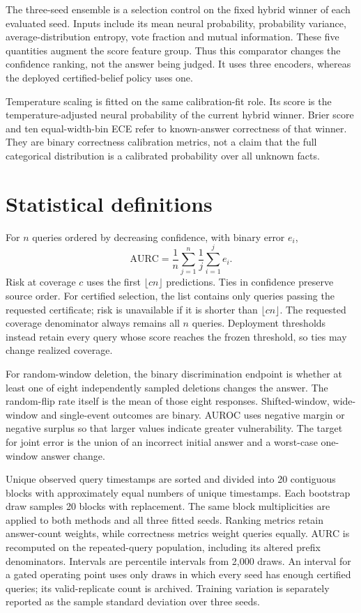 \documentclass[11pt]{article}
\begin{document}
The three-seed ensemble is a selection control on the fixed hybrid winner of
each evaluated seed. Inputs include its mean neural probability, probability
variance, average-distribution entropy, vote fraction and mutual information.
These five quantities augment the score feature group. Thus this comparator
changes the confidence ranking, not the answer being judged. It uses three
encoders, whereas the deployed certified-belief policy uses one.

Temperature scaling is fitted on the same calibration-fit role. Its score is
the temperature-adjusted neural probability of the current hybrid winner.
Brier score and ten equal-width-bin ECE refer to known-answer correctness of
that winner. They are binary correctness calibration metrics, not a claim that
the full categorical distribution is a calibrated probability over all unknown
facts.

\section{Statistical definitions}
For $n$ queries ordered by decreasing confidence, with binary error $e_i$,
\[
\mathrm{AURC}=\frac1n\sum_{j=1}^n\frac1j\sum_{i=1}^je_i.
\]
Risk at coverage $c$ uses the first $\lfloor cn\rfloor$ predictions. Ties in
confidence preserve source order. For certified selection, the list contains
only queries passing the requested certificate; risk is unavailable if it is
shorter than $\lfloor cn\rfloor$. The requested coverage denominator always
remains all $n$ queries. Deployment thresholds instead retain every query whose
score reaches the frozen threshold, so ties may change realized coverage.

For random-window deletion, the binary discrimination endpoint is whether at
least one of eight independently sampled deletions changes the answer. The
random-flip rate itself is the mean of those eight responses. Shifted-window,
wide-window and single-event outcomes are binary. AUROC uses negative margin
or negative surplus so that larger values indicate greater vulnerability.
The target for joint error is the union of an incorrect initial answer and a
worst-case one-window answer change.

Unique observed query timestamps are sorted and divided into 20 contiguous
blocks with approximately equal numbers of unique timestamps. Each bootstrap
draw samples 20 blocks with replacement. The same block multiplicities are
applied to both methods and all three fitted seeds. Ranking metrics retain
answer-count weights, while correctness metrics weight queries equally. AURC
is recomputed on the repeated-query population, including its altered prefix
denominators. Intervals are percentile intervals from 2,000 draws. An interval
for a gated operating point uses only draws in which every seed has enough
certified queries; its valid-replicate count is archived. Training variation
is separately reported as the sample standard deviation over three seeds.
\end{document}
